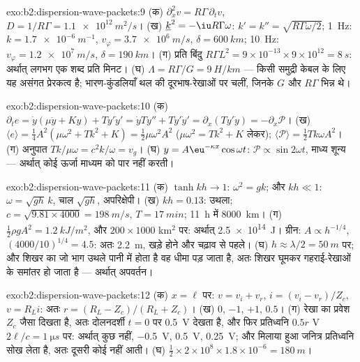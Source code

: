 \begin{solution}{exo:b2:dispersion-wave-packets:9}
(क) $\partial_x^2v = R\Gamma\,\partial_tv$, $D = 1/R\Gamma = \qty{1.1e12}{m^2/s}$। (ख) $\underline k^2
= -\iu R\Gamma\omega$: $k' = k'' = \sqrt{R\Gamma\omega/2}$; \qty{1}{Hz}: $k = \qty{1.7e-6}{m^{-1}}$,
$v_\varphi = \qty{3.7e6}{m/s}$, $\delta = \qty{600}{km}$; \qty{10}{Hz}: $v_\varphi = \qty{1.2e7}{m/s}$,
$\delta = \qty{190}{km}$। (ग) प्रति बिंदु $R\Gamma L^2 = 9 \times 10^{-13} \times 9 \times 10^{12} = \qty{8}{s}$:
अर्थात् लगभग एक शब्द प्रति मिनट। (घ) $\Lambda = R\Gamma/G = \qty{9}{H/km}$ --- किसी
समुद्री केबल के लिए यह असंगत प्रेरकत्व है; भारण-कुंडलियाँ थल की
दूरभाष-रेखाओं पर चलीं, जिनके $G$ और $R\Gamma$ भिन्न थे।
\end{solution}

\begin{solution}{exo:b2:dispersion-wave-packets:10}
(क) $\partial_te = \dot y(\mu\ddot y + Ky) + Ty'\dot y' = \dot yTy'' + Ty'\dot y' = \partial_x
(Ty'\dot y) = -\partial_x\mathcal P$। (ख) $\langle e\rangle = \tfrac14A^2(\mu\omega^2 + Tk^2 + K) =
\tfrac12\mu\omega^2A^2$ ($\mu\omega^2 = Tk^2 + K$ लेकर); $\langle\mathcal P\rangle = \tfrac12Tk\omega
A^2$। (ग) अनुपात $Tk/\mu\omega = c^2k/\omega = v_g$। (घ) $y = A\eu^{-\kappa x}\cos\omega t$:
$\mathcal P \propto \sin2\omega t$, माध्य शून्य --- अर्थात् कोई ऊर्जा माध्यम को पार नहीं करती।
\end{solution}

\begin{solution}{exo:b2:dispersion-wave-packets:11}
(क) $\tanh kh \to 1$: $\omega^2 = gk$; और $kh \ll 1$: $\omega = \sqrt{gh}\,k$, चाल $\sqrt{gh}$,
अपरिक्षेपी। (ख) $kh = 0.13$: उथला; $c = \sqrt{9.81 \times 4000} = \qty{198}{m/s}$,
$T = \qty{17}{min}$; \qty{11}{h} में \qty{8000}{km}। (ग) $\tfrac12\rho gA^2 = \qty{1.2}{kJ/m^2}$,
और $200 \times 1000$ km$^2$ पर: अर्थात् \qty{2.5e14}{J}। ग्रीन: $A \propto h^{-1/4}$, $(4000/10)^{1/4}
= 4.5$: अतः \qty{2.2}{m}, खड़े होने और चढ़ाव से पहले। (घ) $h \approx \lambda/2 =
\qty{50}{m}$ पर; और शिखर का जो भाग उथले पानी में होता है वह धीमा पड़ जाता है, अतः
शिखर घूमकर गहराई-रेखाओं के समांतर हो जाता है --- अर्थात् अपवर्तन।
\end{solution}

\begin{solution}{exo:b2:dispersion-wave-packets:12}
(क) $x = \ell$ पर: $v = v_i + v_r$, $i = (v_i - v_r)/Z_c$, $v = R_Li$: अतः $r = (R_L -
Z_c)/(R_L + Z_c)$। (ख) $0$, $-1$, $+1$, $0.5$। (ग) रेखा का प्रवेश
$Z_c$ जैसा दिखता है, अतः दोलनदर्शी $t = 0$ पर \qty{0.5}{V} देखता है, और फिर
प्रतिध्वनि $0.5r$ V $2\ell/c = \qty{1}{\micro s}$ पर: अर्थात् कुछ नहीं, \qty{-0.5}{V}, \qty{+0.5}{V}, \qty{+0.25}{V}; और
मिलाया हुआ जनित्र प्रतिध्वनि सोख लेता है, अतः दूसरी कोई नहीं आती। (घ)
$\tfrac12 \times 2 \times 10^8 \times 1.8 \times 10^{-6} = \qty{180}{m}$।
\end{solution}

